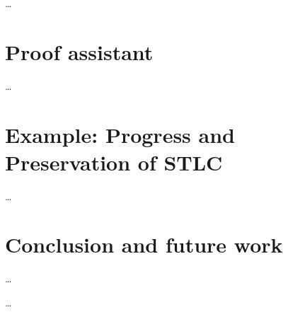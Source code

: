 \documentclass[english, mgr]{iithesis}
\begin{document}
\dots

\chapter{Proof assistant}

\dots

\chapter{Example: Progress and Preservation of STLC}

\dots

\chapter{Conclusion and future work}

\dots


\begin{thebibliography}{1}
 \ldots
\end{thebibliography}
\end{document}
